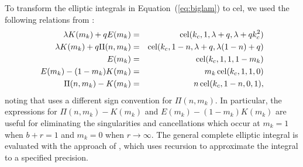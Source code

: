\documentclass[modern,trackchanges]{aastex63}
\begin{document}
To transform the elliptic integrals in Equation~(\ref{eq:biglam}) to $\mathrm{cel}$,
we used the following relations from \citet{Bulirsch1969}:
\begin{eqnarray} \label{eq:cel_identities}
\lambda K(m_k) + q E(m_k) &=& {\rm cel}(k_c,1,\lambda+q,\lambda+q k_c^2)\\
\lambda K(m_k) + q \Pi(n,m_k) &=& {\rm cel}(k_c,1-n,\lambda+q,\lambda (1-n) + q)\\
E(m_k) &=& {\rm cel}(k_c,1,1,1-m_k)\\
E(m_k)-(1-m_k)K(m_k) &=& m_k \, {\rm cel}(k_c,1,1,0)\\
\Pi(n,m_k)-K(m_k)  &=& n \, {\rm cel}(k_c,1-n,0,1),
\end{eqnarray}
noting that \citet{Bulirsch1969} uses a different sign convention for $\Pi(n,m_k)$.
In particular, the expressions for $\Pi(n,m_k)-K(m_k)$ and $E(m_k)-(1-m_k)K(m_k)$ are useful for eliminating
the singularities and cancellations which occur at $m_k=1$ when $b+r=1$ and $m_k=0$ when
$r \rightarrow \infty$.  The general complete elliptic integral is evaluated
with the approach of \citet{Bartky1938}, which uses recursion to approximate the
integral to a specified precision.
\end{document}
